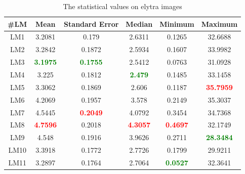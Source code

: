 \documentclass[review]{elsarticle}
\begin{document}
\begin{table}[htbp]
	\begin{tabular}{ | c | c | c | c | c | c | }
\hline
	 \textbf{\#LM} & \textbf{Mean} & \textbf{Standard Error} & \textbf{Median} & \textbf{Minimum} & \textbf{Maximum} \\ \hline
	LM1 & 3.2081 & 0.179 & 2.6311 & 0.1265 & 32.6688 \\ \hline
	LM2 & 3.2842 & 0.1872 & 2.5934 & 0.1607 & 33.9982 \\ \hline
	LM3 & \textcolor{green}{\textbf{3.1975}} & \textcolor{green}{\textbf{0.1755}} & 2.5412 & 0.0763 & 31.0928 \\ \hline
	LM4 & 3.225 & 0.1812 & \textcolor{green}{\textbf{2.479}} & 0.1485 & 33.1458 \\ \hline
	LM5 & 3.3062 & 0.1869 & 2.606 & 0.1187 & \textcolor{red}{\textbf{35.7959}} \\ \hline
	LM6 & 4.2069 & 0.1957 & 3.578 & 0.2149 & 35.3037 \\ \hline
	LM7 & 4.5445 & \textcolor{red}{\textbf{0.2049}} & 4.0792 & 0.3454 & 34.7368 \\ \hline
	LM8 & \textcolor{red}{\textbf{4.7596}} & 0.2018 & \textcolor{red}{\textbf{4.3057}} & \textcolor{red}{\textbf{0.4697}} & 32.1749 \\ \hline
	LM9 & 4.548 & 0.1916 & 3.9626 & 0.2711 & \textcolor{green}{\textbf{28.3484}} \\ \hline
	LM10 & 3.3918 & 0.1772 & 2.7726 & 0.1799 & 29.9211 \\ \hline
	LM11 & 3.2897 & 0.1764 & 2.7064 & \textcolor{green}{\textbf{0.0527}} & 32.3641 \\ \hline
\end{tabular}
\caption{The statistical values on elytra images}
\label{a3}
\end{table}
\end{document}
